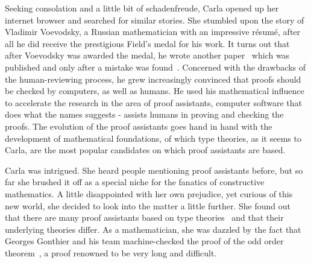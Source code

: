 Seeking consolation and a little bit of schadenfreude, Carla opened up her internet browser and searched for similar stories. She stumbled upon the story of Vladimir Voevodsky, a Russian mathematician with an impressive résumé, after all he did receive the prestigious Field's medal for his work. It turns out that after Voevodsky was awarded the medal, he wrote another paper~ which was published and only after a mistake was found~. Concerned with the drawbacks of the human-reviewing process, he grew increasingly convinced that proofs should be checked by computers, as well as humans. He used his mathematical influence to accelerate the research in the area of proof assistants, computer software that does what the names suggests - assists humans in proving and checking the proofs. The evolution of the proof assistants goes hand in hand with the development of mathematical foundations, of which type theories, as it seems to Carla, are the most popular candidates on which proof assistants are based.

Carla was intrigued. She heard people mentioning proof assistants before, but so far she brushed it off as a special niche for the fanatics of constructive mathematics. A little disappointed with her own prejudice, yet curious of this new world, she decided to look into the matter a little further. She found out that there are many proof assistants based on type theories~ and that their underlying theories differ. As a mathematician, she was dazzled by the fact that Georges Gonthier and his team machine-checked the proof of the odd order theorem~, a proof renowned to be very long and difficult.

